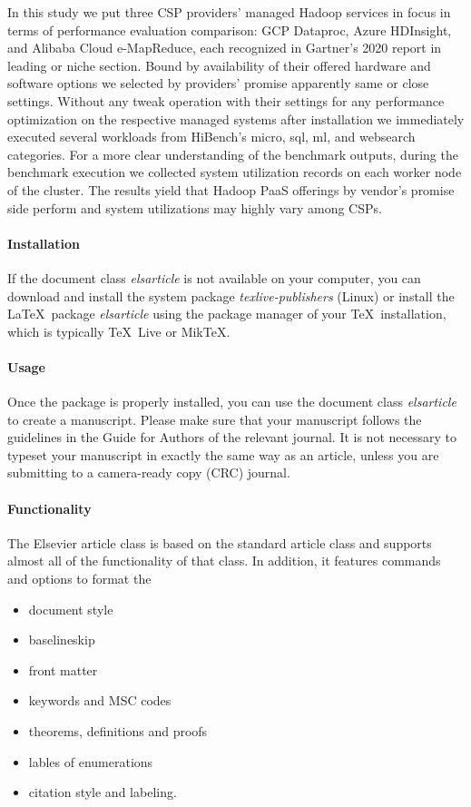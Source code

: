 \documentclass[review]{elsarticle}
\begin{document}
In this study we put three CSP providers' managed Hadoop services in focus in terms of performance evaluation comparison: GCP Dataproc, Azure HDInsight, and Alibaba Cloud e-MapReduce, each recognized in Gartner's 2020 report in leading or niche section. Bound by availability of their offered hardware and software options we selected by providers' promise apparently same or close settings. Without any tweak operation with their settings for any performance optimization on the respective managed systems after installation we immediately executed several workloads from HiBench's micro, sql, ml, and websearch categories. For a more clear understanding of the benchmark outputs, during the benchmark execution we collected system utilization records on each worker node of the cluster. The results yield that Hadoop PaaS offerings by vendor's promise side perform and system utilizations may highly vary among CSPs.

\paragraph{Installation} If the document class \emph{elsarticle} is not available on your computer, you can download and install the system package \emph{texlive-publishers} (Linux) or install the \LaTeX\ package \emph{elsarticle} using the package manager of your \TeX\ installation, which is typically \TeX\ Live or Mik\TeX.

\paragraph{Usage} Once the package is properly installed, you can use the document class \emph{elsarticle} to create a manuscript. Please make sure that your manuscript follows the guidelines in the Guide for Authors of the relevant journal. It is not necessary to typeset your manuscript in exactly the same way as an article, unless you are submitting to a camera-ready copy (CRC) journal.

\paragraph{Functionality} The Elsevier article class is based on the standard article class and supports almost all of the functionality of that class. In addition, it features commands and options to format the
\begin{itemize}
\item document style
\item baselineskip
\item front matter
\item keywords and MSC codes
\item theorems, definitions and proofs
\item lables of enumerations
\item citation style and labeling.
\end{itemize}
\end{document}
